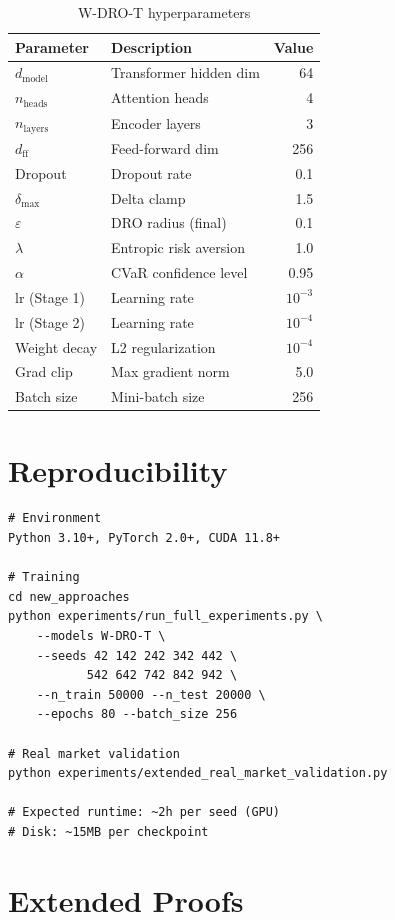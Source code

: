 \documentclass[11pt]{article}
\begin{document}
\begin{table}[h]
\centering
\caption{W-DRO-T hyperparameters}
\small
\begin{tabular}{llr}
\toprule
\textbf{Parameter} & \textbf{Description} & \textbf{Value} \\
\midrule
$d_{\mathrm{model}}$ & Transformer hidden dim & 64 \\
$n_{\mathrm{heads}}$ & Attention heads & 4 \\
$n_{\mathrm{layers}}$ & Encoder layers & 3 \\
$d_{\mathrm{ff}}$ & Feed-forward dim & 256 \\
Dropout & Dropout rate & 0.1 \\
$\delta_{\max}$ & Delta clamp & 1.5 \\
$\varepsilon$ & DRO radius (final) & 0.1 \\
$\lambda$ & Entropic risk aversion & 1.0 \\
$\alpha$ & CVaR confidence level & 0.95 \\
lr (Stage 1) & Learning rate & $10^{-3}$ \\
lr (Stage 2) & Learning rate & $10^{-4}$ \\
Weight decay & L2 regularization & $10^{-4}$ \\
Grad clip & Max gradient norm & 5.0 \\
Batch size & Mini-batch size & 256 \\
\bottomrule
\end{tabular}
\end{table}

\section{Reproducibility}
\label{app:reproduce}

\begin{verbatim}
# Environment
Python 3.10+, PyTorch 2.0+, CUDA 11.8+

# Training
cd new_approaches
python experiments/run_full_experiments.py \
    --models W-DRO-T \
    --seeds 42 142 242 342 442 \
           542 642 742 842 942 \
    --n_train 50000 --n_test 20000 \
    --epochs 80 --batch_size 256

# Real market validation
python experiments/extended_real_market_validation.py

# Expected runtime: ~2h per seed (GPU)
# Disk: ~15MB per checkpoint
\end{verbatim}

\section{Extended Proofs}
\label{app:proof}
\end{document}
